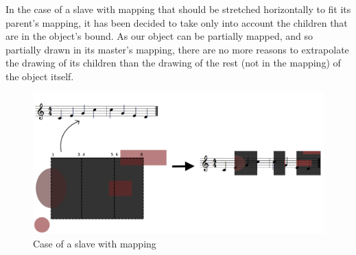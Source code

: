 \documentclass[a4paper]{article}
\begin{document}
In the case of a slave with mapping that should be stretched horizontally to fit its parent's mapping, it has been decided to take only into account the children that are in the object's bound.
As our object can be partially mapped, and so partially drawn in its master's mapping, there are no more reasons to extrapolate the drawing of its children than the drawing of the rest (not in the mapping) of the object itself.

\begin{figure}[h]
\begin{center}
\includegraphics[width=15cm]{img/withStretchTotal.png}
\caption{Case of a slave with mapping}
\label{fig:mapping}
\end{center}
\end{figure}






\end{document}
